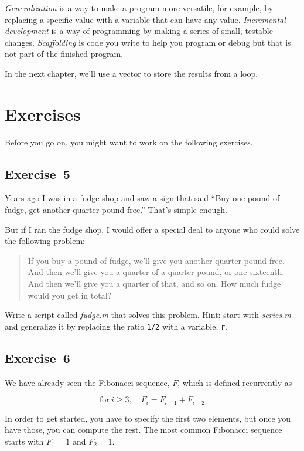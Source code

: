 \emph{Generalization} is a way to make a program more versatile, for example, by replacing a specific value with a variable that can have any value.
\emph{Incremental development} is a way of programming by making a series of small, testable changes.
\emph{Scaffolding} is code you write to help you program or debug but
that is not part of the finished program.

In the next chapter, we'll use a vector to store the results from a loop.


\section{Exercises}

Before you go on, you might want to work on the following exercises.

\subsection{Exercise~5}
Years ago I was in a fudge shop and saw a sign that said ``Buy one pound of fudge, get another quarter pound free.''  That's simple enough.

But if I ran the fudge shop, I would offer a special deal to anyone who could solve the following problem:

\begin{quote}
If you buy a pound of fudge, we'll give you another quarter pound free.  And then we'll give you a quarter of a quarter pound, or one-sixteenth.  And then we'll give you a quarter of that, and so on.  How much fudge would you get in total?
\end{quote}

Write a script called \emph{fudge.m} that solves this problem.  Hint: start with \emph{series.m} and generalize it by replacing the ratio \lstinline{1/2} with a variable, \lstinline{r}.





\subsection{Exercise~6}
\label{fib2}

We have already seen the Fibonacci sequence, $F$, which
is defined recurrently as

\[ \mathrm{for}~i \ge 3, \quad  F_{i} = F_{i-1} + F_{i-2} \]

In order to get started, you have to specify the first two
elements, but once you have those, you can compute the rest.
The most common Fibonacci sequence starts with $F_1 = 1$ and $F_2 = 1$.

